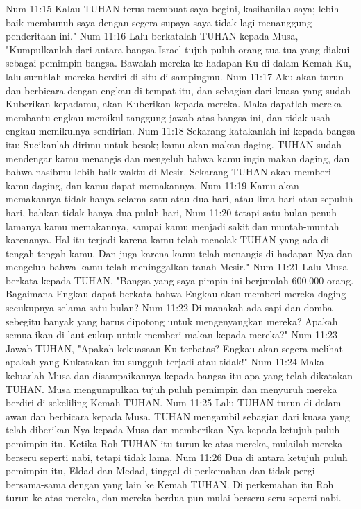 Num 11:15  Kalau TUHAN terus membuat saya begini, kasihanilah saya; lebih baik membunuh saya dengan segera supaya saya tidak lagi menanggung penderitaan ini."
Num 11:16  Lalu berkatalah TUHAN kepada Musa, "Kumpulkanlah dari antara bangsa Israel tujuh puluh orang tua-tua yang diakui sebagai pemimpin bangsa. Bawalah mereka ke hadapan-Ku di dalam Kemah-Ku, lalu suruhlah mereka berdiri di situ di sampingmu.
Num 11:17  Aku akan turun dan berbicara dengan engkau di tempat itu, dan sebagian dari kuasa yang sudah Kuberikan kepadamu, akan Kuberikan kepada mereka. Maka dapatlah mereka membantu engkau memikul tanggung jawab atas bangsa ini, dan tidak usah engkau memikulnya sendirian.
Num 11:18  Sekarang katakanlah ini kepada bangsa itu: Sucikanlah dirimu untuk besok; kamu akan makan daging. TUHAN sudah mendengar kamu menangis dan mengeluh bahwa kamu ingin makan daging, dan bahwa nasibmu lebih baik waktu di Mesir. Sekarang TUHAN akan memberi kamu daging, dan kamu dapat memakannya.
Num 11:19  Kamu akan memakannya tidak hanya selama satu atau dua hari, atau lima hari atau sepuluh hari, bahkan tidak hanya dua puluh hari,
Num 11:20  tetapi satu bulan penuh lamanya kamu memakannya, sampai kamu menjadi sakit dan muntah-muntah karenanya. Hal itu terjadi karena kamu telah menolak TUHAN yang ada di tengah-tengah kamu. Dan juga karena kamu telah menangis di hadapan-Nya dan mengeluh bahwa kamu telah meninggalkan tanah Mesir."
Num 11:21  Lalu Musa berkata kepada TUHAN, "Bangsa yang saya pimpin ini berjumlah 600.000 orang. Bagaimana Engkau dapat berkata bahwa Engkau akan memberi mereka daging secukupnya selama satu bulan?
Num 11:22  Di manakah ada sapi dan domba sebegitu banyak yang harus dipotong untuk mengenyangkan mereka? Apakah semua ikan di laut cukup untuk memberi makan kepada mereka?"
Num 11:23  Jawab TUHAN, "Apakah kekuasaan-Ku terbatas? Engkau akan segera melihat apakah yang Kukatakan itu sungguh terjadi atau tidak!"
Num 11:24  Maka keluarlah Musa dan disampaikannya kepada bangsa itu apa yang telah dikatakan TUHAN. Musa mengumpulkan tujuh puluh pemimpin dan menyuruh mereka berdiri di sekeliling Kemah TUHAN.
Num 11:25  Lalu TUHAN turun di dalam awan dan berbicara kepada Musa. TUHAN mengambil sebagian dari kuasa yang telah diberikan-Nya kepada Musa dan memberikan-Nya kepada ketujuh puluh pemimpin itu. Ketika Roh TUHAN itu turun ke atas mereka, mulailah mereka berseru seperti nabi, tetapi tidak lama.
Num 11:26  Dua di antara ketujuh puluh pemimpin itu, Eldad dan Medad, tinggal di perkemahan dan tidak pergi bersama-sama dengan yang lain ke Kemah TUHAN. Di perkemahan itu Roh turun ke atas mereka, dan mereka berdua pun mulai berseru-seru seperti nabi.
